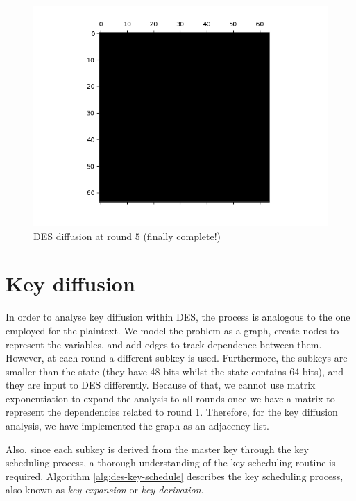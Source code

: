 \documentclass{report}
\begin{document}
\begin{figure}[H]
    \centering
    \includegraphics[scale=0.7]{sparse_des_difusao_iteracao_5.png}
    \caption{DES diffusion at round $5$ (finally complete!)}
    \label{fig:desdif5}
\end{figure}

\section{Key diffusion}\label{sec:key-diff}
In order to analyse key diffusion within DES, the process is analogous to the one employed for the plaintext. We model the problem as a graph, create nodes to represent the variables, and add edges to track dependence between them. However, at each round a different subkey is used. Furthermore, the subkeys are smaller than the state (they have 48 bits whilst the state contains 64 bits), and they are input to DES differently. Because of that, we cannot use matrix exponentiation to expand the analysis to all rounds once we have a matrix to represent the dependencies related to round 1. Therefore, for the key diffusion analysis, we have implemented the graph as an adjacency list.

Also, since each subkey is derived from the master key through the key scheduling process, a thorough understanding of the key scheduling routine is required. Algorithm \ref{alg:des-key-schedule} describes the key scheduling process, also known as \emph{key expansion} or \emph{key derivation}.
\end{document}
